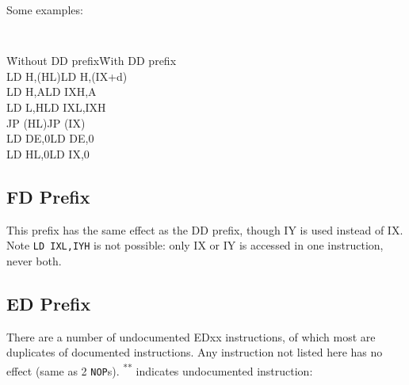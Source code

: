 \documentclass[12pt,twoside,openright,a4paper]{book}
\newcommand{\See}[1]{\textsuperscript{#1}}
\begin{document}
\pagebreak
Some examples:

{\tt 
	\begin{tabbing}
		{\qquad}\={\rm Without DD prefix}\qquad\={\rm With DD prefix}\+ \\
		LD H,(HL)\>LD H,(IX+d)\\
		LD H,A\>LD IXH,A\\
		LD L,H\>LD IXL,IXH\\
		JP (HL)\>JP (IX)\\
		LD DE,0\>LD DE,0\\
		LD HL,0\>LD IX,0\\
	\end{tabbing}
}


\subsection{FD Prefix \cite{gerton}}

This prefix has the same effect as the DD prefix, though IY is used instead of IX.  Note {\tt LD IXL,IYH} is not possible: only IX or IY is accessed in one instruction, never both.


\subsection{ED Prefix \cite{gerton}}

There are a number of undocumented EDxx instructions, of which most are duplicates of documented instructions. Any instruction not listed here has no effect (same as 2 {\tt NOP}s). \See{**} indicates undocumented instruction:
\end{document}
